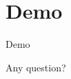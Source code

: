 \documentclass{beamer}
\begin{document}
    \section{Demo}
    \begin{frame}
    \Huge{\centerline{Demo}}
    \end{frame}

    \begin{frame}
    \Huge{\centerline{Any question?}}
    \end{frame}
\end{document}
